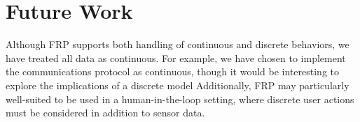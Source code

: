 \section{Future Work}

Although FRP supports both handling of continuous and discrete behaviors, we have treated all data as continuous.
For example, we have chosen to implement the communications protocol as continuous, though it would be interesting to explore the implications of a discrete model
Additionally, FRP may particularly well-suited to be used in a human-in-the-loop setting, where discrete user actions must be considered in addition to sensor data.

